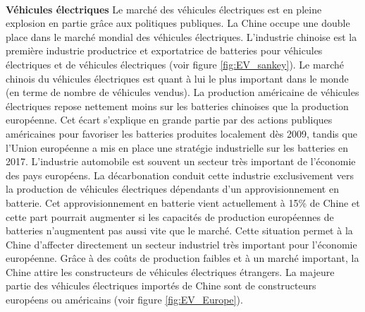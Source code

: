 ~\\
\textbf{Véhicules électriques}
\smallbreak
Le marché des véhicules électriques est en pleine explosion en partie grâce aux politiques publiques. La Chine occupe une double place dans le marché mondial des véhicules électriques. L'industrie chinoise est la première industrie productrice et exportatrice de batteries pour véhicules électriques et de véhicules électriques (voir figure \ref{fig:EV_sankey}). Le marché chinois du véhicules électriques est quant à lui le plus important dans le monde (en terme de nombre de véhicules vendus).\smallbreak
La production américaine de véhicules électriques repose nettement moins sur les batteries chinoises que la production européenne. Cet écart s'explique en grande partie par des actions publiques américaines pour favoriser les batteries produites localement dès 2009, tandis que l'Union européenne a mis en place une stratégie industrielle sur les batteries en 2017.\smallbreak
L'industrie automobile est souvent un secteur très important de l'économie des pays européens. La décarbonation conduit cette industrie exclusivement vers la production de véhicules électriques dépendants d'un approvisionnement en batterie. Cet approvisionnement en batterie vient actuellement à 15\% de Chine et cette part pourrait augmenter si les capacités de production européennes de batteries n'augmentent pas aussi vite que le marché. Cette situation permet à la Chine d'affecter directement un secteur industriel très important pour l'économie européenne.\smallbreak
Grâce à des coûts de production faibles et à un marché important, la Chine attire les constructeurs de véhicules électriques étrangers. La majeure partie des véhicules électriques importés de Chine sont de constructeurs européens ou américains (voir figure \ref{fig:EV_Europe}).
